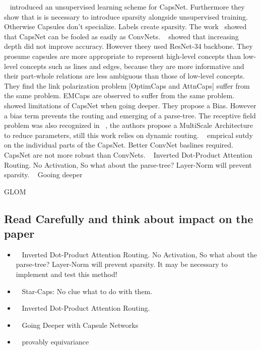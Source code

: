 \documentclass{article}
\begin{document}
~\cite{corr/Rawlinson2018} introduced an unsupervised learning scheme for CapsNet. Furthermore they show that is is necessary to introduce sparsity alongside unsupervised training. Otherwise Capsules don't specialize. Labels create sparsity.
The work~\cite{corr/Michels19} showed that CapsNet can be fooled as easily as ConvNets.
~\cite{acml/PaikKK19} showed that increasing depth did not improve accuracy. However theey used ResNet-34 backbone. They prosume
capsules are more appropriate to represent high-level concepts than low-level concepts
such as lines and edges, because they are more informative and their part-whole
relations are less ambiguous than those of low-level concepts. They find the link polarization problem [OptimCaps and AttnCaps] suffer from the same problem. EMCaps are observed to suffer from the same problem.
~\cite{prl/PeerSR21} showed limitations of CapsNet when going deeper. They propose a Bias. However a bias term prevents the routing and emerging of a parse-tree.
The receptive field problem was also recognized in ~\cite{spl/XiangZTZX18}, the authors propose a MultiScale Architecture to reduce parameters, still this work relies on dynamic routing.
~\cite{cvpr/GuT021} emprical sutdy on the individual parts of the CapsNet. Better ConvNet baslines required. CapsNet are not more robust than ConvNets.
~\cite{iclr/TsaiSGS20} Inverted Dot-Product Attention Routing. No Activation, So what about the parse-tree? Layer-Norm will prevent sparsity.
~\cite{cvpr/RajasegaranJJJS19} Gooing deeper

GLOM ~\cite{corr/Hinton2021}


\subsection*{Read Carefully and think about impact on the paper}
\begin{itemize}
	\item ~\cite{iclr/TsaiSGS20} Inverted Dot-Product Attention Routing. No Activation, So what about the parse-tree? Layer-Norm will prevent sparsity. It may be necessary to implement and test this method!
	\item ~\cite{nips/AhmedT19} Star-Caps: No clue what to do with them.
	\item ~\cite{iclr/TsaiSGS20} Inverted Dot-Product Attention Routing.
	\item ~\cite{cvpr/RajasegaranJJJS19} Going Deeper with Capsule Networks
	\item ~\cite{nips/LenssenFL18} provably equivariance
\end{itemize}
\end{document}
